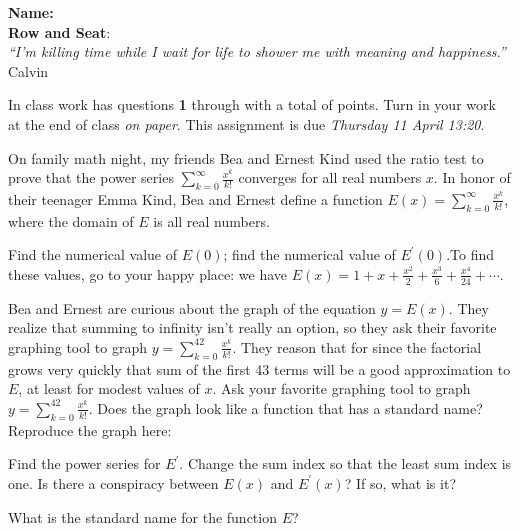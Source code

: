 \documentclass[12pt,fleqn]{exam}
\newcommand{\quiz}{22}
\newcommand{\due}{Thursday 11 April 13:20}
\newcommand{\class}{MATH 202, Fall \the\year}
\begin{document}
\vspace{0.1in}
\noindent\makebox[3.0truein][l]{\textbf{\class}}
\textbf{Name:} \hrulefill \\
\noindent \makebox[3.0truein][l]{\textbf{In class work  \quiz}}
\textbf{Row and Seat}:\hrulefill\\

\noindent \emph{“I'm killing time while I wait for life to shower me with meaning and happiness.” } \hfill {\sc Calvin}

\vspace{0.1in}

\noindent  In class work  has questions \textbf{1} 
through  \textbf{\numquestions} \/ with a total of 
\textbf{\numpoints\/} points. Turn in your work at the end of class 
\emph{on paper}. This assignment is due \emph{\due}.

\vspace{0.1in}


\noindent On family math night, my friends Bea and Ernest Kind used the ratio test to prove that the power series $\sum_{k=0}^\infty \frac{x^k}{k!}$ converges for
all real numbers $x$.  In honor of their teenager  Emma Kind, Bea and Ernest define a function $E(x) = \sum_{k=0}^\infty \frac{x^k}{k!}$, where the domain of $E$ is all real numbers.

\begin{questions} 

\question[2] Find the numerical value of $E(0)$; find the numerical value of $E^\prime(0)$.To find these values, go to your happy place: we have
$E(x) = 1 + x + \frac{x^2}{2} +  \frac{x^3}{6} +  \frac{x^4}{24} + \cdots.$
\begin{solution}[1.5in]
\end{solution}
\question[2] Bea and Ernest are curious about the graph of the equation $y = E(x)$. They realize that summing to infinity isn't really an option, so they ask their favorite graphing tool to
graph $y = \sum_{k=0}^{42} \frac{x^k}{k!}$. They reason that for since the factorial grows very quickly that sum of the first 43 terms will be a good approximation to $E$, at least for
modest values of $x$.      Ask your favorite graphing tool to graph $y = \sum_{k=0}^{42} \frac{x^k}{k!}$. Does the graph look like a function that has a standard name? Reproduce
the graph here:
\begin{solution}[3.5in]
\end{solution}

\newpage
\question[2]  Find the power series for $E^\prime$. Change the sum index so that the least sum index is one.   Is there a conspiracy between $E(x)$ and $E^\prime(x)$? If so, what is it?
\begin{solution}[3.5in]
\end{solution}


\question[2] What is the standard name for the function $E$?
\begin{solution}[3.5in]
\end{solution}





\end{questions}
\end{document}

